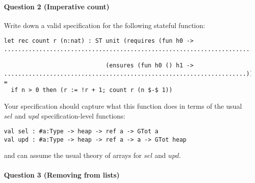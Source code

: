 \documentclass[a4paper,11pt]{article}
\begin{document}
\clearpage

\paragraph{Question 2 (Imperative count)}

Write down a valid specification for the following stateful function:
\begin{lstlisting}
let rec count r (n:nat) : ST unit (requires (fun h0 -> ............................................................................))

                             (ensures (fun h0 () h1 -> .....................................................................)) = 
  if n > 0 then (r := !r + 1; count r (n $-$ 1))
\end{lstlisting}
Your specification should capture what this function does in terms of
the usual \ls$sel$ and \ls$upd$ specification-level functions:
\begin{lstlisting}
val sel : #a:Type -> heap -> ref a -> GTot a
val upd : #a:Type -> heap -> ref a -> a -> GTot heap
\end{lstlisting}
and can assume the usual theory of arrays for \ls$sel$ and \ls$upd$.


\paragraph{Question 3 (Removing from lists)}
\end{document}
